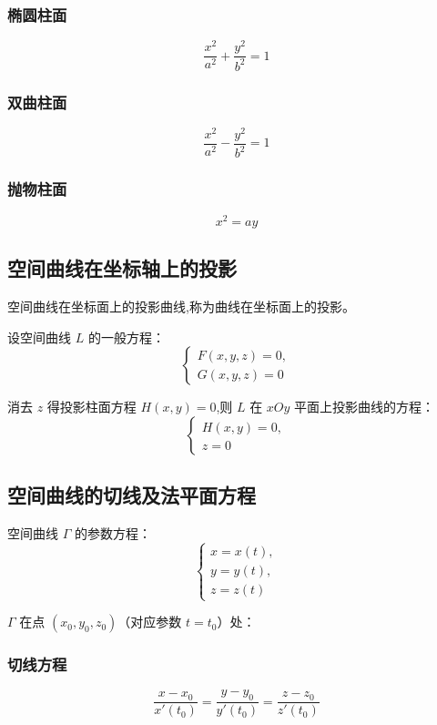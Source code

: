 \documentclass[UTF8]{ctexart}
\theoremstyle{remark}
\begin{document}
			\subsubsection*{椭圆柱面}  
			\[ \frac{x^2}{a^2} + \frac{y^2}{b^2} = 1 \]  
			
			\subsubsection*{双曲柱面}  
			\[ \frac{x^2}{a^2} - \frac{y^2}{b^2} = 1 \]  
			
			\subsubsection*{抛物柱面}  
			\[ x^2 = ay \]  
			
			
			\subsection{空间曲线在坐标轴上的投影}
			空间曲线在坐标面上的投影曲线,称为曲线在坐标面上的投影。  
			
			设空间曲线 \( L \) 的一般方程：  
			\[ \begin{cases} 
				F(x, y, z) = 0, \\ 
				G(x, y, z) = 0 
			\end{cases} \]  
			
			消去 \( z \) 得投影柱面方程 \( H(x, y) = 0 \),则 \( L \) 在 \( xOy \) 平面上投影曲线的方程：  
			\[ \begin{cases} 
				H(x, y) = 0, \\ 
				z = 0 
			\end{cases} \]  
			
			
			\subsection{空间曲线的切线及法平面方程}
			空间曲线 \( \Gamma \) 的参数方程：  
			\[ \begin{cases} 
				x = x(t), \\ 
				y = y(t), \\ 
				z = z(t) 
			\end{cases} \]  
			
			\( \Gamma \) 在点 \( (x_0, y_0, z_0) \)（对应参数 \( t = t_0 \)）处：  
			
			\subsubsection*{切线方程}  
			\[ \frac{x - x_0}{x'(t_0)} = \frac{y - y_0}{y'(t_0)} = \frac{z - z_0}{z'(t_0)} \]  
			
\end{document}
